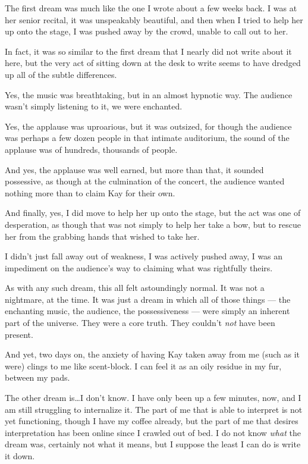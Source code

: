 The first dream was much like the one I wrote about a few weeks back. I was at her senior recital, it was unspeakably beautiful, and then when I tried to help her up onto the stage, I was pushed away by the crowd, unable to call out to her.

In fact, it was so similar to the first dream that I nearly did not write about it here, but the very act of sitting down at the desk to write seems to have dredged up all of the subtle differences.

Yes, the music was breathtaking, but in an almost hypnotic way. The audience wasn't simply listening to it, we were enchanted.

Yes, the applause was uproarious, but it was outsized, for though the audience was perhaps a few dozen people in that intimate auditorium, the sound of the applause was of hundreds, thousands of people.

And yes, the applause was well earned, but more than that, it sounded possessive, as though at the culmination of the concert, the audience wanted nothing more than to claim Kay for their own.

And finally, yes, I did move to help her up onto the stage, but the act was one of desperation, as though that was not simply to help her take a bow, but to rescue her from the grabbing hands that wished to take her.

I didn't just fall away out of weakness, I was actively pushed away, I was an impediment on the audience's way to claiming what was rightfully theirs.

As with any such dream, this all felt astoundingly normal. It was not a nightmare, at the time. It was just a dream in which all of those things --- the enchanting music, the audience, the possessiveness --- were simply an inherent part of the universe. They were a core truth. They couldn't \emph{not} have been present.

And yet, two days on, the anxiety of having Kay taken away from me (such as it were) clings to me like scent-block. I can feel it as an oily residue in my fur, between my pads.

The other dream is\ldots I don't know. I have only been up a few minutes, now, and I am still struggling to internalize it. The part of me that is able to interpret is not yet functioning, though I have my coffee already, but the part of me that desires interpretation has been online since I crawled out of bed. I do not know \emph{what} the dream was, certainly not what it means, but I suppose the least I can do is write it down.


